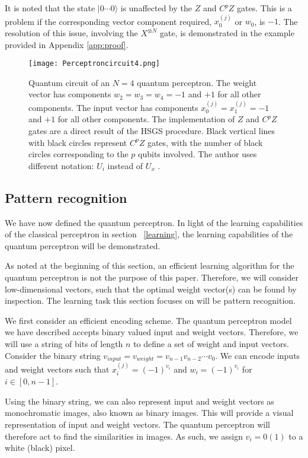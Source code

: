 \documentclass[twocolumn,superscriptaddress]{revtex4-1}
\begin{document}
It is noted that the state $|0 \cdots 0 \rangle$ is unaffected by the $Z$ and $C^pZ$ gates. This is a problem if the corresponding vector component required, $x^{(j)}_0$ or $w_0$, is $-1$. The resolution of this issue, involving the $X^{\otimes N}$ gate, is demonstrated in the example provided in Appendix \ref{app:proof}.

\begin{figure*}[t!]
\texttt{[image: Perceptroncircuit4.png]}
\caption{Quantum circuit of an $N=4$ quantum perceptron. The weight vector has components $w_2 = w_3 = w_4 = -1$ and $+1$ for all other components. The input vector has components $x^{(j)}_0 = x^{(j)}_1 = -1$ and $+1$ for all other components. The implementation of $Z$ and $C^pZ$ gates are a direct result of the HSGS procedure. Black vertical lines with black circles represent $C^pZ$ gates, with the number of black circles corresponding to the $p$ qubits involved. The author uses different notation: $U_i$ instead of $U_x$ \cite{Tacchino_2019}.}
\label{fig:Perceptroncircuit4}
\end{figure*}

\subsection{Pattern recognition} \label{pattern}

We have now defined the quantum perceptron. In light of the learning capabilities of the classical perceptron in section ~\ref{learning}, the learning capabilities of the quantum perceptron will be demonstrated. 

As noted at the beginning of this section, an efficient learning algorithm for the quantum perceptron is not the purpose of this paper. Therefore, we will consider low-dimensional vectors, such that the optimal weight vector(s) can be found by inspection. The learning task this section focuses on will be pattern recognition.

We first consider an efficient encoding scheme. The quantum perceptron model we have described accepts binary valued input and weight vectors. Therefore, we will use a string of bits of length $n$ to define a set of weight and input vectors. Consider the binary string $v_{input} = v_{weight} = v_{n-1} v_{n-2} \cdots v_0$. We can encode inputs and weight vectors such that $x^{(j)}_i = (-1)^{v_i}$ and $w_i = (-1)^{v_i}$ for $i \in [0, n-1]$. 

Using the binary string, we can also represent input and weight vectors as monochromatic images, also known as binary images. This will provide a visual representation of input and weight vectors. The quantum perceptron will therefore act to find the similarities in images. As such, we assign $v_i = 0(1)$ to a white (black) pixel.
\end{document}
